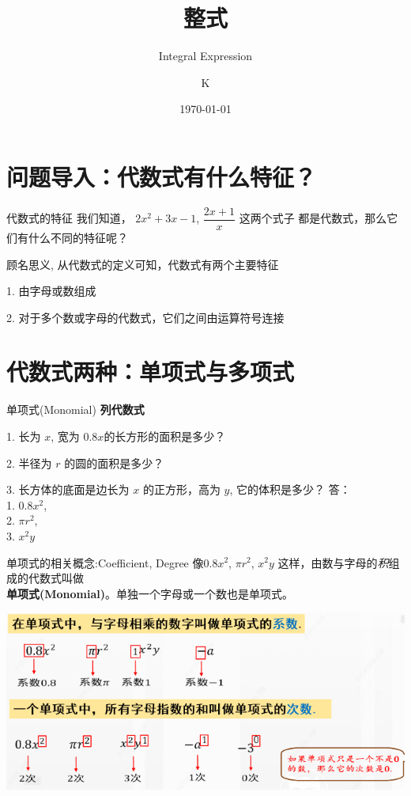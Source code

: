 \documentclass{beamer}
\title{整式}
\subtitle{Integral Expression}
\institute{Norsesun Milieu}
\author{K}
\date{\today}
\begin{document}
	\frame{\titlepage}
	
	\section{问题导入：代数式有什么特征？}
	\begin{frame}{代数式的特征}
		我们知道， $ 2x^2 + 3x - 1$, $ \dfrac{2x+1}{x} $ 这两个式子
		都是代数式，那么它们有什么不同的特征呢？
		
		\pause
		顾名思义, 从代数式的定义可知，代数式有两个主要特征
		
		1. 由字母或数组成
		
		2. 对于多个数或字母的代数式，它们之间由运算符号连接
	\end{frame}
	
	\section{代数式两种：单项式与多项式}
	\begin{frame}{单项式(Monomial)}
		\textbf{列代数式}
		
			1. 长为 $x$, 宽为 $0.8x$的长方形的面积是多少？
			
			2. 半径为 $r$ 的圆的面积是多少？
			
			3. 长方体的底面是边长为 $x$ 的正方形，高为 $y$, 它的体积是多少？
			\pause
			答：\\
				1. $0.8x^2$, 	\\
				2. $\pi r^2$, \\
				3. $x^2y$

	\end{frame}
	
	\begin{frame}{单项式的相关概念:Coefficient, Degree}
		像$0.8x^2$, $\pi r^2$, $x^2y$ 这样，由数与字母的\emph{积}组成的代数式叫做\\
		\textbf{单项式(Monomial)}。单独一个字母或一个数也是单项式。
		
		\includegraphics[width = .8\textwidth]{assets/monomial concepts.png}
	\end{frame}
	
\end{document}
